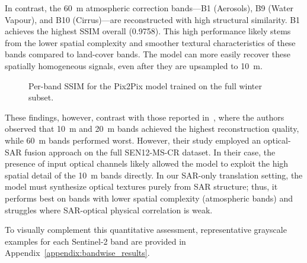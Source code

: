 \documentclass[remotesensing,article,submit,pdftex,moreauthors]{Definitions/mdpi}
\begin{document}
In contrast, the 60~m atmospheric correction bands—B1 (Aerosols), B9 (Water Vapour), and B10 (Cirrus)—are reconstructed with high structural similarity. B1 achieves the highest SSIM overall (0.9758). This high performance likely stems from the lower spatial complexity and smoother textural characteristics of these bands compared to land-cover bands. The model can more easily recover these spatially homogeneous signals, even after they are upsampled to 10~m.


\begin{figure}[!htbp]
\centering
{}
\caption[Per-band SSIM for the Pix2Pix model]{Per-band SSIM for the Pix2Pix model trained on the full winter subset.}
\label{fig:ssim_per_band}
\end{figure}

These findings, however, contrast with those reported in~\cite{CR_SEN2_dRNN}, where the authors observed that 10~m and 20~m bands achieved the highest reconstruction quality, while 60~m bands performed worst. However, their study employed an optical-SAR fusion approach on the full SEN12-MS-CR dataset. In their case, the presence of input optical channels likely allowed the model to exploit the high spatial detail of the 10~m bands directly. In our SAR-only translation setting, the model must synthesize optical textures purely from SAR structure; thus, it performs best on bands with lower spatial complexity (atmospheric bands) and struggles where SAR-optical physical correlation is weak.

To visually complement this quantitative assessment, representative grayscale examples for each Sentinel-2 band are provided in Appendix~\ref{appendix:bandwise_results}.
\end{document}
